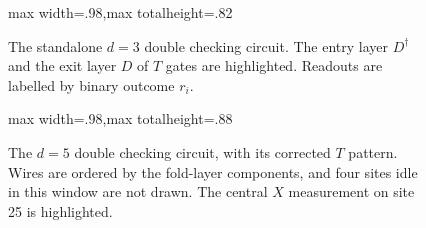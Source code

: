 \begin{figure}[htbp]\centering
\begin{adjustbox}{max width=.98\linewidth,max totalheight=.82\textheight}

\end{adjustbox}
\caption{The standalone $d=3$ double checking circuit. The entry layer $D^\dagger$ and the exit layer $D$ of $T$ gates are highlighted. Readouts are labelled by binary outcome $r_i$. 
}
\label{fig:d3circuit}
\end{figure}
\begin{figure}[p]\centering
\begin{adjustbox}{max width=.98\linewidth,max totalheight=.88\textheight}

\end{adjustbox}
\caption{The $d=5$ double checking circuit, with its corrected $T$ pattern. Wires are ordered by the fold-layer components, and four sites idle in this window are not drawn. The central $X$ measurement on site 25 is highlighted.
}
\label{fig:d5circuit}
\end{figure}
